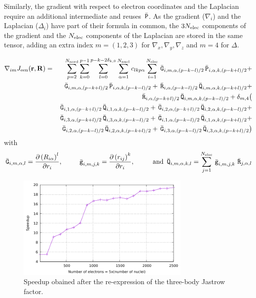 Similarly, the gradient with respect to electron coordinates and the
Laplacian require an additional intermediate and reuses ${\, \bar{\mathtt{P}}}$. As
the gradient ($\nabla_{i}$) and the Laplacian ($\Delta_i$) have part
of their formula in common, the $3N_{\text{elec}}$ components of the gradient and
the $N_{\text{elec}}$ components of the Laplacian are stored in the same tensor,
adding an extra index $m=(1,2,3)$ for $\nabla_x, \nabla_y,\nabla_z$
and $m=4$ for $\Delta$.

\newcommand{\tg}{\, \bar{\mathtt{g}}}
\newcommand{\tG}{\, \bar{\mathtt{G}}}
\newcommand{\tQ}{\, \bar{\mathtt{Q}}}

\begin{eqnarray*}
  \nabla_{im} \Jeen(\br,\bR) & = &
  \sum_{p=2}^{\Nord}\sum_{k=0}^{p-1}
  \sum_{l=0}^{\lmax} 
    \sum_{\alpha=1}^{\Nat}
    c_{lkp\alpha}
    \sum_{i=1}^{\Nel} 
     {\tG}_{i,m,\alpha,(p-k-l)/2} {\tP}_{i,\alpha,k,(p-k+l)/2} +  \\
&&   {\tG}_{i,m,\alpha,(p-k+l)/2} {\tP}_{i,\alpha,k,(p-k-l)/2} + 
     {\tR}_{i,\alpha,(p-k-l)/2} {\tQ}_{i,m,\alpha,k,(p-k+l)/2} + \\
&&   {\tR}_{i,\alpha,(p-k+l)/2} {\tQ}_{i,m,\alpha,k,(p-k-l)/2} + 
    \delta_{m,4} \big( \\
&&     {\tG}_{i,1,\alpha,(p-k+l)/2} {\tQ}_{i,1,\alpha,k,(p-k-l)/2} +
       {\tG}_{i,2,\alpha,(p-k+l)/2} {\tQ}_{i,2,\alpha,k,(p-k-l)/2} + \\
&&     {\tG}_{i,3,\alpha,(p-k+l)/2} {\tQ}_{i,3,\alpha,k,(p-k-l)/2} +
       {\tG}_{i,1,\alpha,(p-k-l)/2} {\tQ}_{i,1,\alpha,k,(p-k+l)/2} + \\
&&     {\tG}_{i,2,\alpha,(p-k-l)/2} {\tQ}_{i,2,\alpha,k,(p-k+l)/2} + 
       {\tG}_{i,3,\alpha,(p-k-l)/2} {\tQ}_{i,3,\alpha,k,(p-k+l)/2} \big)
\end{eqnarray*}
with 
\[
  {\tG}_{i, m, \alpha, l}  =  \frac{\partial \left( {R}_{i\alpha} \right)^l}
                             {\partial r_i},  \phantom{ space }
  {\tg}_{i, m, j, k}  =  \frac{\partial \left( {r}_{ij} \right)^k}
                             {\partial r_i}, \phantom{ space }
                             \text{ and } 
  {\tQ}_{i, m, \alpha, k, l}  =  \sum_{j=1}^{\Nel}
                            {\tg}_{i,m,j,k}\,{\tR}_{j,\alpha,l} 
\]
  
\begin{figure}[t]
  \begin{center}
  \includegraphics[width=0.75\textwidth]{speedup.pdf}
  \end{center}
  \caption{\label{fig:speedup}Speedup obained after the re-expression of the three-body
    Jastrow factor.}
\end{figure}

